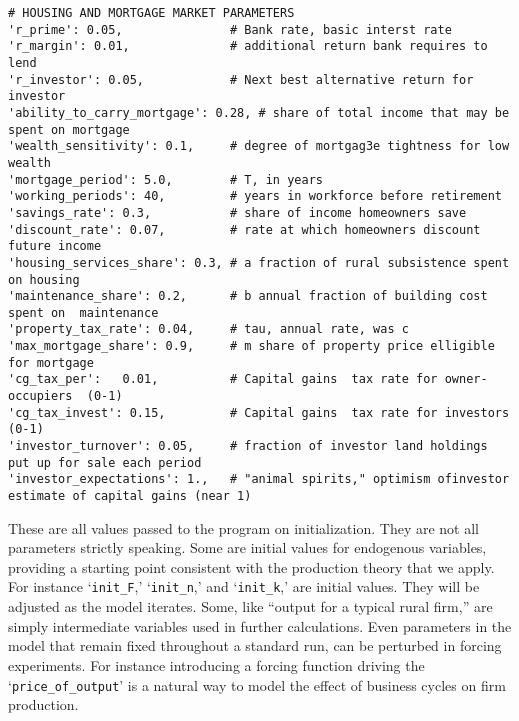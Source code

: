 {\begin{verbatim}
# HOUSING AND MORTGAGE MARKET PARAMETERS
'r_prime': 0.05,               # Bank rate, basic interst rate
'r_margin': 0.01,              # additional return bank requires to lend
'r_investor': 0.05,            # Next best alternative return for investor
'ability_to_carry_mortgage': 0.28, # share of total income that may be spent on mortgage
'wealth_sensitivity': 0.1,     # degree of mortgag3e tightness for low wealth
'mortgage_period': 5.0,        # T, in years
'working_periods': 40,         # years in workforce before retirement
'savings_rate': 0.3,           # share of income homeowners save
'discount_rate': 0.07,         # rate at which homeowners discount future income
'housing_services_share': 0.3, # a fraction of rural subsistence spent on housing
'maintenance_share': 0.2,      # b annual fraction of building cost spent on  maintenance
'property_tax_rate': 0.04,     # tau, annual rate, was c
'max_mortgage_share': 0.9,     # m share of property price elligible for mortgage
'cg_tax_per':   0.01,          # Capital gains  tax rate for owner-occupiers  (0-1)
'cg_tax_invest': 0.15,         # Capital gains  tax rate for investors  (0-1)
'investor_turnover': 0.05,     # fraction of investor land holdings put up for sale each period
'investor_expectations': 1.,   # "animal spirits," optimism ofinvestor estimate of capital gains (near 1)

\end{verbatim} }

These are all values passed to the program on initialization. They are not all parameters strictly speaking. Some are initial values for endogenous variables, %
providing a starting point consistent with the production theory that we apply. For instance `\texttt{init\_F},' `\texttt{init\_n},' and `\texttt{init\_k},' are initial values. They will be adjusted as the model iterates.  Some, like ``output for a typical rural firm,'' are simply intermediate variables used in further calculations.  %
Even parameters in the model that remain  fixed throughout a standard run, can be perturbed in forcing experiments. For instance introducing a forcing function driving  the `\texttt{price\_of\_output}' is a natural way to model the effect of business cycles on firm production.